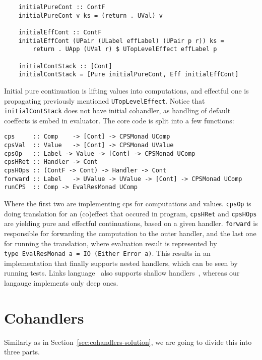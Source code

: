 \documentclass[declaration,shortabstract]{iithesis}
\theoremstyle{definition} \newtheorem{definition}{Definition}[chapter]
\theoremstyle{remark} \newtheorem{remark}[definition]{Observation}
\theoremstyle{plain} \newtheorem{theorem}[definition]{Theorem}
\theoremstyle{plain} \newtheorem{lemma}[definition]{Lemma}
\begin{document}
\begin{verbatim}
    initialPureCont :: ContF
    initialPureCont v ks = (return . UVal) v

    initialEffCont :: ContF
    initialEffCont (UPair (ULabel effLabel) (UPair p r)) ks =
        return . UApp (UVal r) $ UTopLevelEffect effLabel p

    initialContStack :: [Cont]
    initialContStack = [Pure initialPureCont, Eff initialEffCont]
\end{verbatim}

    \noindent
    Initial pure continuation is lifting values into computations,
    and effectful one is propagating previously mentioned \verb!UTopLevelEffect!.
    Notice that \verb!initialContStack! does not have initial cohandler,
    as handling of default coeffects is embed in evaluator. The core code is
    split into a few functions:

\begin{verbatim}
cps     :: Comp    -> [Cont] -> CPSMonad UComp
cpsVal  :: Value   -> [Cont] -> CPSMonad UValue
cpsOp   :: Label -> Value -> [Cont] -> CPSMonad UComp
cpsHRet :: Handler -> Cont
cpsHOps :: (ContF -> Cont) -> Handler -> Cont
forward :: Label   -> UValue -> UValue -> [Cont] -> CPSMonad UComp
runCPS  :: Comp -> EvalResMonad UComp
\end{verbatim}

    \noindent
    Where the first two are implementing cps for computations and values.
    \verb!cpsOp! is doing translation for an (co)effect that occured in program,
    \verb!cpsHRet! and \verb!cpsHOps! are yielding pure and effectful continuations,
    based on a given handler. \verb!forward! is responsible for forwarding the
    computation to the outer handler, and the last one for running the
    translation, where evaluation result is represented by\\
    \verb!type EvalResMonad a = IO (Either Error a)!. This results in an
    implementation that finally supports nested handlers, which can be seen by
    running tests. Links language~\cite{handlers-cps-journal} also supports
    shallow handlers~\cite{shallow-handlers}, whereas our langauge implements
    only deep ones.

    \section{Cohandlers}

    Similarly as in Section~\ref{sec:cohandlers-solution}, we are going to
    divide this into three parts.
\end{document}
